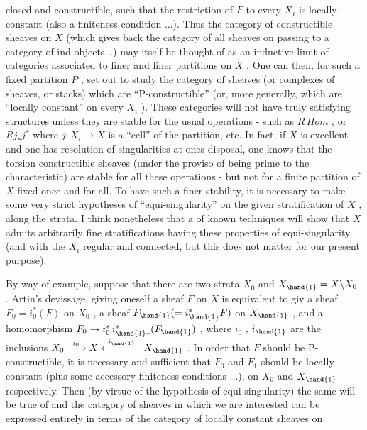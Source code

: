 
closed and constructible, such that the restriction of $F$ to every $X_i$
is locally constant (also a finiteness condition ...). Thus the category
of constructible sheaves on $X$ (which gives back the category of all sheaves
on passing to a category of ind-objects...) may itself be thought of as an
inductive limit of categories associated to finer and finer partitions on $X$ .
One can then, for such a fixed partition $P$ , set out to study the category
of sheaves (or complexes of sheaves, or stacks) which are ``P-constructible''
(or, more generally, which are ``locally constant'' on every $X_i$ ). These
categories will not have truly satisfying structures unless they are stable
for the usual operations - such as $R\,\mathit{Hom}$ , or $Rj_*j^*$ where $j : X_i \to X$ is
a ``cell'' of the partition, etc. In fact, if $X$ is excellent and one has
resolution of singularities at ones disposal, one knows that the torsion
constructible sheaves (under the proviso of being prime to the characteristic)
are stable for all these operations - but not for a finite partition of
$X$ fixed once and for all. To have such a finer stability, it is necessary
to make some very strict hypotheses of ``\uline{equi}-\uline{singularity}'' on the given
stratification of $X$ , along the strata. I think nonetheless that a 
 of known techniques will show that $X$ admits arbitrarily fine
stratifications having these properties of equi-singularity (and with the
$X_i$ regular and connected, but this does not matter for our present purpose).

\margin{$\_\!\|\!\overline{\ \ }$} \margin{$\_\!\|\!\overline{\ \ }$} By way of example, suppose that there are  two  strata\hand{,}  $X_0$\hand{,} and
$X_{\hand{1}} = X\backslash X_0$ .   Artin's devissage, giving oneself a sheaf $F$ on $X$ is
equivalent to  giv a sheaf $F_0 = i^*_0(F)$ on $X_0$ , a sheaf $F_{\hand{1}}(= i^*_{\hand{1}}F)$
on $X_{\hand{1}}$ , and a homomorphism $F_0 \to i^*_0\, i^*_{\hand{1}*}(F_{\hand{1}})$ , where $i_0$ , $i_{\hand{1}}$ are the
inclusions $X_0 \xrightarrow{\ i_0\ } X \xleftarrow{\ i_{\hand{1}}\ } X_{\hand{1}}$ . In order that $F$ should be P-constructible, it
is necessary and sufficient that $F_0$ and $F_1$ should be locally constant
(plus some accessory finiteness conditions ...), on $X_0$ and $X_{\hand{1}}$ respectively.
Then (by virtue of the hypothesis of equi-singularity) the same will be true
of   and the category of sheaves in which we are interested can be
expressed entirely in terms of the category of locally constant sheaves on


